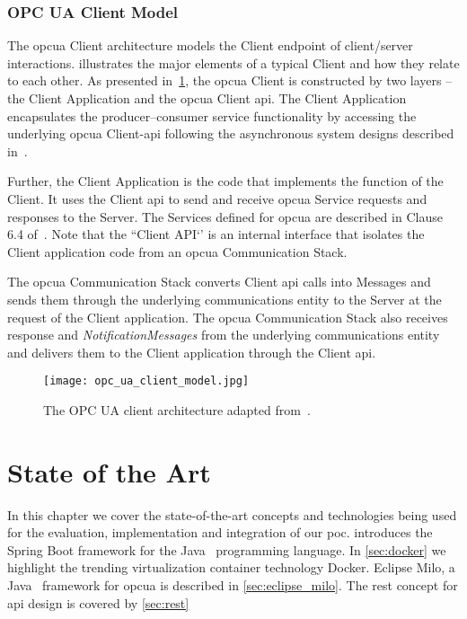 \documentclass[
a4paper,
twoside,
headsepline,
cleardoublepage=empty,
parskip=half,
draft=false
]{scrbook}
\begin{document}
			\subsection{OPC UA Client Model}\label{subsec:opc_ua_client_model}

				The \gls{opcua} Client architecture models the Client endpoint of client/server interactions.
				 illustrates the major elements of a typical Client and how they relate to each other.
				As presented in~\cref{fig:opc_ua_client_model}, the \gls{opcua} Client is constructed by two layers -- the Client Application and the \gls{opcua} Client \gls{api}. The Client Application encapsulates the producer–consumer service functionality by accessing the underlying \gls{opcua} Client-\gls{api} following the asynchronous system designs described in~\cite{tanenbaum2007distributed}.
				
				Further, the Client Application is the code that implements the function of the Client.
				It uses the Client \gls{api} to send and receive \gls{opcua} Service requests and responses to the Server.
				The Services defined for \gls{opcua} are described in Clause 6.4 of~\cite{opcfoundation2017part4}.
				Note that the ``Client API`' is an internal interface that isolates the Client application code from an \gls{opcua} Communication Stack.
				
				The \gls{opcua} Communication Stack converts Client \gls{api} calls into Messages and sends them through the underlying communications entity to the Server at the request of the Client application.
				The \gls{opcua} Communication Stack also receives response and \textit{NotificationMessages} from the underlying communications entity and delivers them to the Client application through the Client \gls{api}.

				\begin{figure}[htbp]
					\centering
					\texttt{[image: opc\_ua\_client\_model.jpg]}
					\caption{The OPC UA client architecture adapted from~\cite{opcfoundation2017part1}.}
					\label{fig:opc_ua_client_model}
				\end{figure}

	\chapter{State of the Art}\label{ch:state_of_the_art}
	
		In this chapter we cover the state-of-the-art concepts and technologies being used for the evaluation, implementation and integration of our \gls{poc}.  introduces the Spring Boot framework for the Java~\cite{java2015} programming language. In \cref{sec:docker} we highlight the trending virtualization container technology Docker. Eclipse Milo, a Java~\cite{java2015} framework for \gls{opcua} is described in \cref{sec:eclipse_milo}. The \gls{rest} concept for \gls{api} design is covered by \cref{sec:rest}
\end{document}
